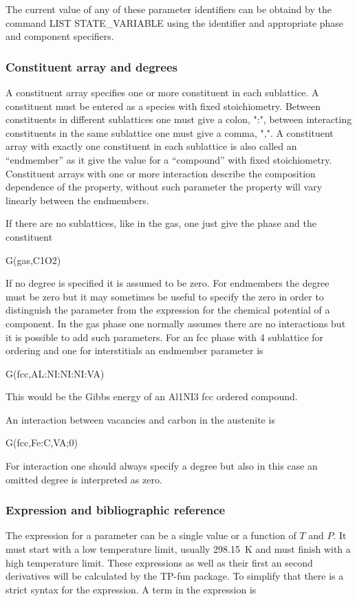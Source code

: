 \documentclass[12pt]{article}
\begin{document}
The current value of any of these parameter identifiers can be obtaind
by the command LIST STATE\_VARIABLE using the identifier and
appropriate phase and component specifiers.

\subsubsection{Constituent array and degrees}

A constituent array specifies one or more constituent in each
sublattice.  A constituent must be entered as a species with fixed
stoichiometry.  Between constituents in different sublattices one must
give a colon, ":", between interacting constituents in the same
sublattice one must give a comma, ",".  A constituent array with
exactly one constituent in each sublattice is also called an
``endmember'' as it give the value for a ``compound'' with fixed
stoichiometry.  Constituent arrays with one or more interaction
describe the composition dependence of the property, without such
parameter the property will vary linearly between the endmembers.

If there are no sublattices, like in the gas, one just give the phase
and the constituent

G(gas,C1O2)

If no degree is specified it is assumed to be zero.  For endmembers
the degree must be zero but it may sometimes be useful to specify the
zero in order to distinguish the parameter from the expression for the
chemical potential of a component.  In the gas phase one normally
assumes there are no interactions but it is possible to add such
parameters.  For an fcc phase with 4 sublattice for ordering and one
for interstitials an endmember parameter is

G(fcc,AL:NI:NI:NI:VA)

This would be the Gibbs energy of an Al1NI3 fcc ordered compound.

An interaction between vacancies and carbon in the austenite is

G(fcc,Fe:C,VA;0)

For interaction one should always specify a degree but also in this
case an omitted degree is interpreted as zero.

\subsubsection{Expression and bibliographic reference}

The expression for a parameter can be a single value or a function of
$T$ and $P$.  It must start with a low temperature limit, usually
298.15~K and must finish with a high temperature limit.  These
expressions as well as their first an second derivatives will be
calculated by the TP-fun package.  To simplify that there is a strict
syntax for the expression.  A term in the expression is
\end{document}
